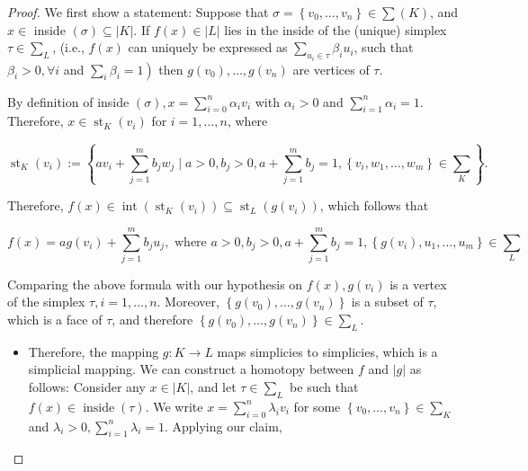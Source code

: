 \begin{proof} We first show a statement: Suppose that \(\sigma  = \left\{  {{v}_{0}, \ldots, {v}_{n}}\right\}   \in  \sum \left( K\right)\), and \(x \in\) inside \(\left( \sigma \right)  \subseteq  \left| K\right|\). If \(f\left( x\right)  \in  \left| L\right|\) lies in the inside of the (unique) simplex \(\tau  \in  {\sum }_{L}\), (i.e., \(f\left( x\right)\) can uniquely be expressed as \(\mathop{\sum }\limits_{{{u}_{i} \in  \tau }}{\beta }_{i}{u}_{i}\), such that \({\beta }_{i} > 0, \forall i\) and \(\left. {\mathop{\sum }\limits_{i}{\beta }_{i} = 1}\right)\) then \(g\left( {v}_{0}\right), \ldots, g\left( {v}_{n}\right)\) are vertices of \(\tau\).

By definition of inside \(\left( \sigma \right), x = \mathop{\sum }\limits_{{i = 0}}^{n}{\alpha }_{i}{v}_{i}\) with \({\alpha }_{i} > 0\) and \(\mathop{\sum }\limits_{{i = 1}}^{n}{\alpha }_{i} = 1\). Therefore, \(x \in  {\operatorname{st}}_{K}\left( {v}_{i}\right)\) for \(i = 1, \ldots, n\), where

\[
{\operatorname{st}}_{K}\left( {v}_{i}\right)  \mathrel{\text{ := }} \left\{  {a{v}_{i} + \mathop{\sum }\limits_{{j = 1}}^{m}{b}_{j}{w}_{j} \mid  a > 0, {b}_{j} > 0, a + \mathop{\sum }\limits_{{j = 1}}^{m}{b}_{j} = 1, \left\{  {{v}_{i}, {w}_{1}, \ldots, {w}_{m}}\right\}   \in  {\sum }_{K}}\right\} .
\]

Therefore, \(f\left( x\right)  \in  \operatorname{int}\left( {{\operatorname{st}}_{K}\left( {v}_{i}\right) }\right)  \subseteq  {\operatorname{st}}_{L}\left( {g\left( {v}_{i}\right) }\right)\), which follows that

\[
f\left( x\right)  = {ag}\left( {v}_{i}\right)  + \mathop{\sum }\limits_{{j = 1}}^{m}{b}_{j}{u}_{j}, \text{ where }a > 0, {b}_{j} > 0, a + \mathop{\sum }\limits_{{j = 1}}^{m}{b}_{j} = 1, \left\{  {g\left( {v}_{i}\right), {u}_{1}, \ldots, {u}_{m}}\right\}   \in  {\sum }_{L}
\]

Comparing the above formula with our hypothesis on \(f\left( x\right), g\left( {v}_{i}\right)\) is a vertex of the simplex \(\tau, i = 1, \ldots, n\). Moreover, \(\left\{  {g\left( {v}_{0}\right), \ldots, g\left( {v}_{n}\right) }\right\}\) is a subset of \(\tau\), which is a face of \(\tau\), and therefore \(\left\{  {g\left( {v}_{0}\right), \ldots, g\left( {v}_{n}\right) }\right\}   \in  {\sum }_{L}\).

\begin{itemize}
\item Therefore, the mapping \(g : K \rightarrow  L\) maps simplicies to simplicies, which is a simplicial mapping. We can construct a homotopy between \(f\) and \(\left| g\right|\) as follows: Consider any \(x \in  \left| K\right|\), and let \(\tau  \in  {\sum }_{L}\) be such that \(f\left( x\right)  \in  \operatorname{inside}\left( \tau \right)\). We write \(x = \mathop{\sum }\limits_{{i = 0}}^{n}{\lambda }_{i}{v}_{i}\) for some \(\left\{  {{v}_{0}, \ldots, {v}_{n}}\right\}   \in  {\sum }_{K}\) and \({\lambda }_{i} > 0, \mathop{\sum }\limits_{{i = 1}}^{n}{\lambda }_{i} = 1\). Applying our claim, 
\end{itemize}


\end{proof}
